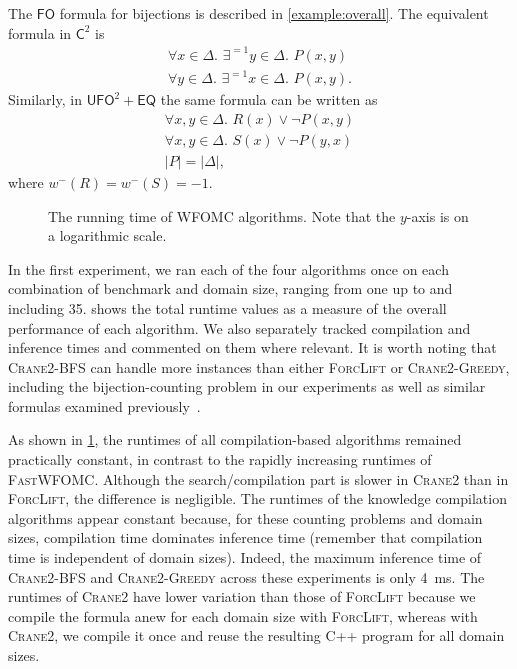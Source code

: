 \documentclass[letterpaper]{article} %
\theoremstyle{remark}
\theoremstyle{definition}
\newcommand{\Ctwo}{$\mathsf{C}^{2}$}
\newcommand{\FO}{$\mathsf{FO}$}
\newcommand{\UFO}{$\mathsf{UFO}^{2} + \mathsf{EQ}$}
\newcommand{\Cranetwo}{\textsc{Crane2}}
\newcommand{\Cranebfs}{\textsc{Crane2-BFS}}
\newcommand{\Cranegreedy}{\textsc{Crane2-Greedy}}
\begin{document}
The \FO{} formula for bijections is described in \cref{example:overall}. The
equivalent formula in \Ctwo{} is
\begin{gather*}
  \forall x \in \Delta\text{. }\exists^{=1} y \in \Delta\text{. }P(x, y)\\
  \forall y \in \Delta\text{. }\exists^{=1} x \in \Delta\text{. }P(x, y).
\end{gather*}
Similarly, in \UFO{} the same formula can be written as
\begin{gather*}
  \forall x, y \in \Delta\text{. }R(x) \lor \neg P(x, y)\\
  \forall x, y \in \Delta\text{. }S(x) \lor \neg P(y, x)\\
  |P| = |\Delta|,
\end{gather*}
where $w^{-}(R) = w^{-}(S) = -1$.

\begin{figure}[t]
  \centering
  
  \caption{The running time of WFOMC algorithms. Note that the $y$-axis is on a
    logarithmic scale.}\label{fig:plot}
\end{figure}

In the first experiment, we ran each of the four algorithms once on each
combination of benchmark and domain size, ranging from one up to and including
35.  shows the total runtime values as a measure of the overall
performance of each algorithm. We also separately tracked compilation and
inference times and commented on them where relevant. It is worth noting that
\Cranebfs{} can handle more instances than either \textsc{ForcLift} or
\Cranegreedy{}, including the bijection-counting problem in our experiments as
well as similar formulas examined previously~\cite{DBLP:conf/kr/DilkasB23}.

As shown in \cref{fig:plot}, the runtimes of all compilation-based algorithms
remained practically constant, in contrast to the rapidly increasing runtimes of
\textsc{FastWFOMC}. Although the search/compilation part is slower in
\Cranetwo{} than in \textsc{ForcLift}, the difference is negligible. The
runtimes of the knowledge compilation algorithms appear constant because, for
these counting problems and domain sizes, compilation time dominates inference
time (remember that compilation time is independent of domain sizes). Indeed,
the maximum inference time of \Cranebfs{} and \Cranegreedy{} across these
experiments is only \SI{4}{\milli\second}. The runtimes of \Cranetwo{} have
lower variation than those of \textsc{ForcLift} because we compile the formula
anew for each domain size with \textsc{ForcLift}, whereas with \Cranetwo{}, we
compile it once and reuse the resulting C++ program for all domain sizes.
\end{document}
